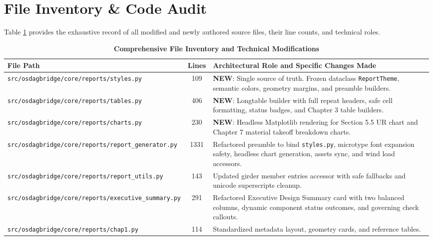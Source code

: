 \documentclass[12pt,a4paper]{article}
\renewcommand{\arraystretch}{1.15}
\begin{document}
\section{File Inventory \& Code Audit}

Table \ref{tab:file-inventory} provides the exhaustive record of all modified and newly authored source files, their line counts, and technical roles.

\begingroup
\renewcommand{\arraystretch}{0.88}
\setlength{\tabcolsep}{4pt}
\begin{table}[H]
  \centering
  \caption{\textbf{Comprehensive File Inventory and Technical Modifications}}
  \label{tab:file-inventory}
  \vspace{0.1cm}
  \begin{tabularx}{\textwidth}{|p{5.6cm}|c|X|}
    \hline
    \rowcolor{OsdagHeaderBg}
    \textbf{File Path} & \textbf{Lines} & \textbf{Architectural Role and Specific Changes Made} \\
    \hline
    \nolinkurl{src/osdagbridge/core/reports/styles.py} & 109 & \textbf{NEW}: Single source of truth. Frozen dataclass \texttt{ReportTheme}, semantic colors, geometry margins, and preamble builders. \\
    \hline
    \rowcolor{OsdagZebra}
    \nolinkurl{src/osdagbridge/core/reports/tables.py} & 406 & \textbf{NEW}: Longtable builder with full repeat headers, safe cell formatting, status badges, and Chapter 3 table builders. \\
    \hline
    \nolinkurl{src/osdagbridge/core/reports/charts.py} & 230 & \textbf{NEW}: Headless Matplotlib rendering for Section 5.5 UR chart and Chapter 7 material takeoff breakdown charts. \\
    \hline
    \rowcolor{OsdagZebra}
    \nolinkurl{src/osdagbridge/core/reports/report_generator.py} & 1331 & Refactored preamble to bind \texttt{styles.py}, microtype font expansion safety, headless chart generation, assets sync, and wind load accessors. \\
    \hline
    \nolinkurl{src/osdagbridge/core/reports/report_utils.py} & 143 & Updated girder member entries accessor with safe fallbacks and unicode superscripts cleanup. \\
    \hline
    \rowcolor{OsdagZebra}
    \nolinkurl{src/osdagbridge/core/reports/executive_summary.py} & 291 & Refactored Executive Design Summary card with two balanced columns, dynamic component status outcomes, and governing check callouts. \\
    \hline
    \nolinkurl{src/osdagbridge/core/reports/chap1.py} & 114 & Standardized metadata layout, geometry cards, and reference tables. \\

\end{tabularx}
\end{table}
\end{document}
